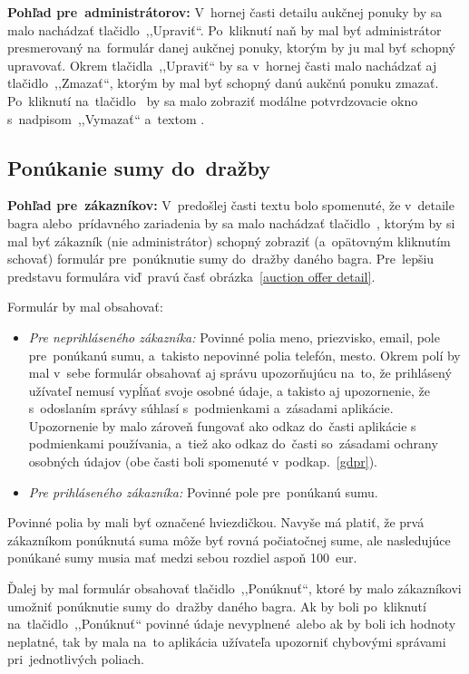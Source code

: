 \textbf{Pohľad pre~administrátorov:} V~hornej časti detailu aukčnej ponuky by sa malo nachádzať tlačidlo~,,Upraviť``. Po~kliknutí naň by mal byť administrátor presmerovaný na~formulár danej aukčnej ponuky, ktorým by ju mal byť schopný upravovať. Okrem tlačidla~,,Upraviť`` by sa v~hornej časti malo nachádzať aj tlačidlo~,,Zmazať``, ktorým by mal byť schopný danú aukčnú ponuku zmazať. Po~kliknutí na~tlačidlo~ by sa malo zobraziť modálne potvrdzovacie okno s~nadpisom~,,Vymazať`` a~textom .

\subsection{Ponúkanie sumy do~dražby}
\label{ponukanie sumy do drazby}

\textbf{Pohľad pre~zákazníkov:} V~predošlej časti textu bolo spomenuté, že v~detaile bagra alebo~prídavného zariadenia by sa malo nachádzať tlačidlo~, ktorým by si mal byť zákazník (nie administrátor) schopný zobraziť (a~opätovným kliknutím schovať) formulár pre~ponúknutie sumy do~dražby daného bagra. Pre~lepšiu predstavu formulára viď~pravú časť obrázka~\ref{auction offer detail}.

Formulár by mal obsahovať:
\begin{itemize}
\item \textit{Pre neprihláseného zákazníka:}
Povinné polia meno, priezvisko, email, pole pre~ponúkanú sumu, a~takisto nepovinné polia telefón, mesto. Okrem polí by mal v~sebe formulár obsahovať aj správu upozorňujúcu na~to, že prihlásený užívateľ nemusí vypĺňať svoje osobné údaje, a takisto aj upozornenie, že s~odoslaním správy súhlasí s~podmienkami a~zásadami aplikácie. Upozornenie by malo zároveň fungovať ako odkaz do~časti aplikácie s podmienkami používania, a~tiež ako odkaz do~časti so~zásadami ochrany osobných údajov (obe časti boli spomenuté v~podkap.~\ref{gdpr}).
\item \textit{Pre prihláseného zákazníka:}
Povinné pole pre~ponúkanú sumu.
\end{itemize}
Povinné polia by mali byť označené hviezdičkou. Navyše má platiť, že prvá zákazníkom ponúknutá suma môže byť rovná počiatočnej sume, ale nasledujúce ponúkané sumy musia mať medzi sebou rozdiel aspoň 100~eur.

Ďalej by mal formulár obsahovať tlačidlo~,,Ponúknuť``, ktoré by malo zákazníkovi umožniť ponúknutie sumy do~dražby daného bagra. Ak by boli po~kliknutí na~tlačidlo~,,Ponúknuť`` povinné údaje nevyplnené~alebo ak by boli ich hodnoty neplatné, tak by mala na~to aplikácia užívateľa upozorniť chybovými správami pri~jednotlivých poliach.

